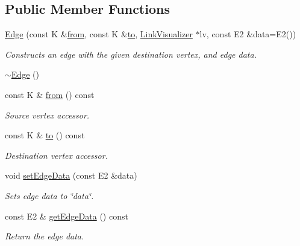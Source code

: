 \subsection*{Public Member Functions}
\begin{DoxyCompactItemize}
\item 
\hyperlink{classbridges_1_1datastructure_1_1_edge_aae44cef647b20d260b449a5fb041ae95}{Edge} (const K \&\hyperlink{classbridges_1_1datastructure_1_1_edge_a0fba8af11c12f73c993f6e8a573daa02}{from}, const K \&\hyperlink{classbridges_1_1datastructure_1_1_edge_a2cece2762a29e3fc18859e0c725eee82}{to}, \hyperlink{classbridges_1_1datastructure_1_1_link_visualizer}{Link\+Visualizer} $\ast$lv, const E2 \&data=E2())
\begin{DoxyCompactList}\small\item\em Constructs an edge with the given destination vertex, and edge data. \end{DoxyCompactList}\item 
\hyperlink{classbridges_1_1datastructure_1_1_edge_a7160632622b92c93036cd6fdcec75959}{$\sim$\+Edge} ()
\item 
const K \& \hyperlink{classbridges_1_1datastructure_1_1_edge_a0fba8af11c12f73c993f6e8a573daa02}{from} () const
\begin{DoxyCompactList}\small\item\em Source vertex accessor. \end{DoxyCompactList}\item 
const K \& \hyperlink{classbridges_1_1datastructure_1_1_edge_a2cece2762a29e3fc18859e0c725eee82}{to} () const
\begin{DoxyCompactList}\small\item\em Destination vertex accessor. \end{DoxyCompactList}\item 
void \hyperlink{classbridges_1_1datastructure_1_1_edge_a8f030413780f15f90141e4ff29240ec0}{set\+Edge\+Data} (const E2 \&data)
\begin{DoxyCompactList}\small\item\em Sets edge data to \char`\"{}data\char`\"{}. \end{DoxyCompactList}\item 
const E2 \& \hyperlink{classbridges_1_1datastructure_1_1_edge_a4769b5d8fc74522f77f5927b230ced7b}{get\+Edge\+Data} () const
\begin{DoxyCompactList}\small\item\em Return the edge data. \end{DoxyCompactList}\item 

\end{DoxyCompactItemize}
